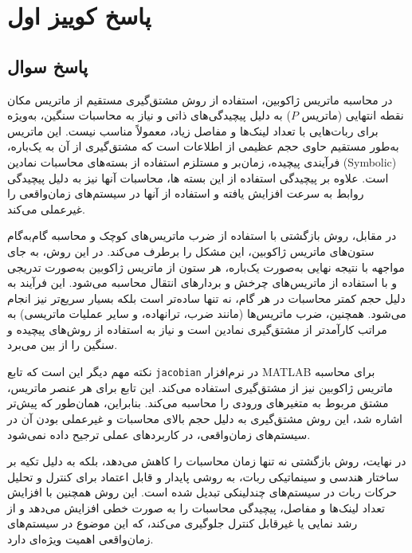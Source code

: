 
\chapter*{پاسخ کوییز اول}
\section*{پاسخ سوال}
در محاسبه ماتریس ژاکوبین، استفاده از روش مشتق‌گیری مستقیم از ماتریس مکان نقطه انتهایی (ماتریس \(P\)) به دلیل پیچیدگی‌های ذاتی و نیاز به محاسبات سنگین، به‌ویژه برای ربات‌هایی با تعداد لینک‌ها و مفاصل زیاد، معمولاً مناسب نیست. این ماتریس به‌طور مستقیم حاوی حجم عظیمی از اطلاعات است که مشتق‌گیری از آن به یک‌باره، فرآیندی پیچیده، زمان‌بر و مستلزم استفاده از بسته‌های محاسبات نمادین (Symbolic) است. علاوه بر پیچیدگی استفاده از این بسته ها، محاسبات آنها نیز به دلیل پیچیدگی روابط به سرعت افزایش یافته و استفاده از آنها در سیستم‌های زمان‌واقعی را غیرعملی می‌کند.

در مقابل، روش بازگشتی با استفاده از ضرب ماتریس‌های کوچک و محاسبه گام‌به‌گام ستون‌های ماتریس ژاکوبین، این مشکل را برطرف می‌کند. در این روش، به جای مواجهه با نتیجه نهایی به‌صورت یک‌باره، هر ستون از ماتریس ژاکوبین به‌صورت تدریجی و با استفاده از ماتریس‌های چرخش و بردارهای انتقال محاسبه می‌شود. این فرآیند به دلیل حجم کمتر محاسبات در هر گام، نه تنها ساده‌تر است بلکه بسیار سریع‌تر نیز انجام می‌شود. همچنین، ضرب ماتریس‌ها (مانند ضرب، ترانهاده، و سایر عملیات ماتریسی) به مراتب کارآمدتر از مشتق‌گیری نمادین است و نیاز به استفاده از روش‌های پیچیده و سنگین را از بین می‌برد. 

نکته مهم دیگر این است که تابع \texttt{jacobian} در نرم‌افزار MATLAB برای محاسبه ماتریس ژاکوبین نیز از مشتق‌گیری استفاده می‌کند. این تابع برای هر عنصر ماتریس، مشتق مربوط به متغیرهای ورودی را محاسبه می‌کند. بنابراین، همان‌طور که پیش‌تر اشاره شد، این روش مشتق‌گیری به دلیل حجم بالای محاسبات و غیرعملی بودن آن در سیستم‌های زمان‌واقعی، در کاربردهای عملی ترجیح داده نمی‌شود.

در نهایت، روش بازگشتی نه تنها زمان محاسبات را کاهش می‌دهد، بلکه به دلیل تکیه بر ساختار هندسی و سینماتیکی ربات، به روشی پایدار و قابل اعتماد برای کنترل و تحلیل حرکات ربات در سیستم‌های چندلینکی تبدیل شده است. این روش همچنین با افزایش تعداد لینک‌ها و مفاصل، پیچیدگی محاسبات را به صورت خطی افزایش می‌دهد و از رشد نمایی یا غیرقابل کنترل جلوگیری می‌کند، که این موضوع در سیستم‌های زمان‌واقعی اهمیت ویژه‌ای دارد.
